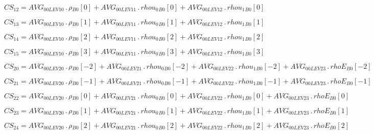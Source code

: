 \documentclass{article}
\begin{document}
\begin{dmath}CS_{12} = AVG_{0 0 LEV 10} \,.\, {\rho{_{B0}}}[{0}] + AVG_{0 0 LEV 11} \,.\, {rhou_{0}{_{B0}}}[{0}] + AVG_{0 0 LEV 12} \,.\, {rhou_{1}{_{B0}}}[{0}]\end{dmath}

\begin{dmath}CS_{13} = AVG_{0 0 LEV 10} \,.\, {\rho{_{B0}}}[{1}] + AVG_{0 0 LEV 11} \,.\, {rhou_{0}{_{B0}}}[{1}] + AVG_{0 0 LEV 12} \,.\, {rhou_{1}{_{B0}}}[{1}]\end{dmath}

\begin{dmath}CS_{14} = AVG_{0 0 LEV 10} \,.\, {\rho{_{B0}}}[{2}] + AVG_{0 0 LEV 11} \,.\, {rhou_{0}{_{B0}}}[{2}] + AVG_{0 0 LEV 12} \,.\, {rhou_{1}{_{B0}}}[{2}]\end{dmath}

\begin{dmath}CS_{15} = AVG_{0 0 LEV 10} \,.\, {\rho{_{B0}}}[{3}] + AVG_{0 0 LEV 11} \,.\, {rhou_{0}{_{B0}}}[{3}] + AVG_{0 0 LEV 12} \,.\, {rhou_{1}{_{B0}}}[{3}]\end{dmath}

\begin{dmath}CS_{20} = AVG_{0 0 LEV 20} \,.\, {\rho{_{B0}}}[{-2}] + AVG_{0 0 LEV 21} \,.\, {rhou_{0}{_{B0}}}[{-2}] + AVG_{0 0 LEV 22} \,.\, {rhou_{1}{_{B0}}}[{-2}] + AVG_{0 0 LEV 23} \,.\, {rhoE{_{B0}}}[{-2}]\end{dmath}

\begin{dmath}CS_{21} = AVG_{0 0 LEV 20} \,.\, {\rho{_{B0}}}[{-1}] + AVG_{0 0 LEV 21} \,.\, {rhou_{0}{_{B0}}}[{-1}] + AVG_{0 0 LEV 22} \,.\, {rhou_{1}{_{B0}}}[{-1}] + AVG_{0 0 LEV 23} \,.\, {rhoE{_{B0}}}[{-1}]\end{dmath}

\begin{dmath}CS_{22} = AVG_{0 0 LEV 20} \,.\, {\rho{_{B0}}}[{0}] + AVG_{0 0 LEV 21} \,.\, {rhou_{0}{_{B0}}}[{0}] + AVG_{0 0 LEV 22} \,.\, {rhou_{1}{_{B0}}}[{0}] + AVG_{0 0 LEV 23} \,.\, {rhoE{_{B0}}}[{0}]\end{dmath}

\begin{dmath}CS_{23} = AVG_{0 0 LEV 20} \,.\, {\rho{_{B0}}}[{1}] + AVG_{0 0 LEV 21} \,.\, {rhou_{0}{_{B0}}}[{1}] + AVG_{0 0 LEV 22} \,.\, {rhou_{1}{_{B0}}}[{1}] + AVG_{0 0 LEV 23} \,.\, {rhoE{_{B0}}}[{1}]\end{dmath}

\begin{dmath}CS_{24} = AVG_{0 0 LEV 20} \,.\, {\rho{_{B0}}}[{2}] + AVG_{0 0 LEV 21} \,.\, {rhou_{0}{_{B0}}}[{2}] + AVG_{0 0 LEV 22} \,.\, {rhou_{1}{_{B0}}}[{2}] + AVG_{0 0 LEV 23} \,.\, {rhoE{_{B0}}}[{2}]\end{dmath}
\end{document}
